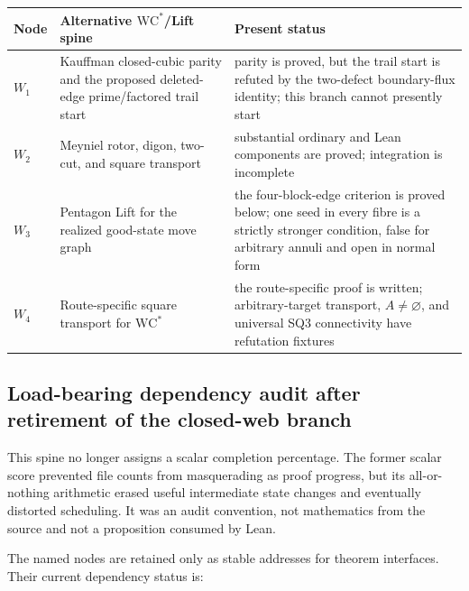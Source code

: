 \begin{center}
\small
\begin{tabular}{@{}p{}p{}p{}@{}}
\toprule
Node & Alternative $\mathrm{WC}^{*}$/Lift spine & Present status \\
\midrule
$W_1$ & Kauffman closed-cubic parity and the proposed deleted-edge
prime/factored trail start & parity is proved, but the trail start is refuted
by the two-defect boundary-flux identity; this branch cannot presently start \\
$W_2$ & Meyniel rotor, digon, two-cut, and square transport & substantial
ordinary and Lean components are proved; integration is incomplete \\
$W_3$ & Pentagon Lift for the realized good-state move graph & the
four-block-edge criterion is proved below; one seed in every fibre is a
strictly stronger condition, false for arbitrary annuli and open in normal
form \\
$W_4$ & Route-specific square transport for $\mathrm{WC}^{*}$ & the
route-specific proof is written; arbitrary-target transport,
$A\ne\varnothing$, and universal SQ3 connectivity have refutation fixtures \\
\bottomrule
\end{tabular}
\end{center}

\subsection{Load-bearing dependency audit after retirement of the closed-web branch}

This spine no longer assigns a scalar completion percentage.  The former
scalar score prevented file counts from masquerading as proof progress, but
its all-or-nothing arithmetic erased useful intermediate state changes and
eventually distorted scheduling.  It was an audit convention, not mathematics
from the source and not a proposition consumed by Lean.

The named nodes are retained only as stable addresses for theorem interfaces.
Their current dependency status is:

